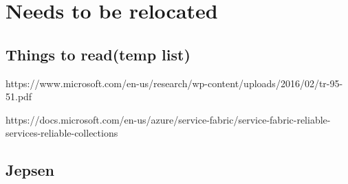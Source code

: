\documentclass[a4paper,10pt,titlepage]{report}
\begin{document}
\chapter{Needs to be relocated}


\section{Things to read(temp list)}

https://www.microsoft.com/en-us/research/wp-content/uploads/2016/02/tr-95-51.pdf

https://docs.microsoft.com/en-us/azure/service-fabric/service-fabric-reliable-services-reliable-collections




\section{Jepsen}
\end{document}
